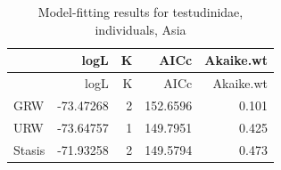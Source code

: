 \documentclass[]{article}
\begin{document}
\begin{longtable}[]{@{}lrrrr@{}}
\caption{Model-fitting results for testudinidae, individuals,
Asia}\tabularnewline
\toprule
& logL & K & AICc & Akaike.wt\tabularnewline
\midrule
\endfirsthead
\toprule
& logL & K & AICc & Akaike.wt\tabularnewline
\midrule
\endhead
GRW & -73.47268 & 2 & 152.6596 & 0.101\tabularnewline
URW & -73.64757 & 1 & 149.7951 & 0.425\tabularnewline
Stasis & -71.93258 & 2 & 149.5794 & 0.473\tabularnewline
\bottomrule
\end{longtable}
\end{document}
